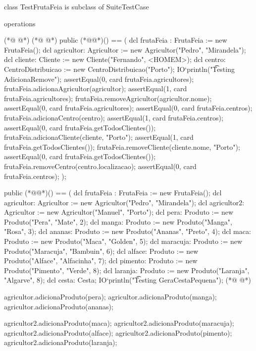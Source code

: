 \begin{vdmpp}[breaklines=true]
class TestFrutaFeia is subclass of SuiteTestCase

operations 

(*@
\label{testGeraCestaPequena:5}
@*)
(*@
\label{testAdicionaRemove:5}
@*)
public (*@@*)() == (
 dcl frutaFeia : FrutaFeia := new FrutaFeia(); 
 dcl agricultor: Agricultor := new Agricultor("Pedro", "Mirandela");
 dcl cliente: Cliente := new Cliente("Fernando", <HOMEM>);
 dcl centro: CentroDistribuicao := new CentroDistribuicao("Porto");
 IO`println("\t Testing AdicionaRemove");
 assertEqual(0, card frutaFeia.agricultores);  
 frutaFeia.adicionaAgricultor(agricultor);
 assertEqual(1, card frutaFeia.agricultores);
 frutaFeia.removeAgricultor(agricultor.nome);
 assertEqual(0, card frutaFeia.agricultores);
 assertEqual(0, card frutaFeia.centros);
 frutaFeia.adicionaCentro(centro);
 assertEqual(1, card frutaFeia.centros);
 assertEqual(0, card frutaFeia.getTodosClientes());
 frutaFeia.adicionaCliente(cliente, "Porto");
 assertEqual(1, card frutaFeia.getTodosClientes());
 frutaFeia.removeCliente(cliente.nome, "Porto");
 assertEqual(0, card frutaFeia.getTodosClientes());
 frutaFeia.removeCentro(centro.localizacao);
 assertEqual(0, card frutaFeia.centros);
);

public (*@@*)() == (
 dcl frutaFeia : FrutaFeia := new FrutaFeia(); 
 dcl agricultor: Agricultor := new Agricultor("Pedro", "Mirandela"); 
 dcl agricultor2: Agricultor := new Agricultor("Manuel", "Porto"); 
 dcl pera: Produto := new Produto("Pera", "Mate", 2);
 dcl manga: Produto := new Produto("Manga", "Rosa", 3);
 dcl ananas: Produto := new Produto("Ananas", "Preto", 4);
 dcl maca: Produto := new Produto("Maca", "Golden", 5);
 dcl maracuja: Produto := new Produto("Maracuja", "Bambuin", 6);
  dcl alface: Produto := new Produto("Alface", "Alfacinha", 7);
  dcl pimento: Produto := new Produto("Pimento", "Verde", 8);
  dcl laranja: Produto := new Produto("Laranja", "Algarve", 8);
 dcl cesta: Cesta;
 IO`println("\t Testing GeraCestaPequena"); 
(*@
\label{testeGereTodasEncomendas:42}
@*)
 
 agricultor.adicionaProduto(pera);
 agricultor.adicionaProduto(manga);
 agricultor.adicionaProduto(ananas);
 
 agricultor2.adicionaProduto(maca);
 agricultor2.adicionaProduto(maracuja);
 agricultor2.adicionaProduto(alface);
 agricultor2.adicionaProduto(pimento);
 agricultor2.adicionaProduto(laranja);
 

\end{vdmpp}
